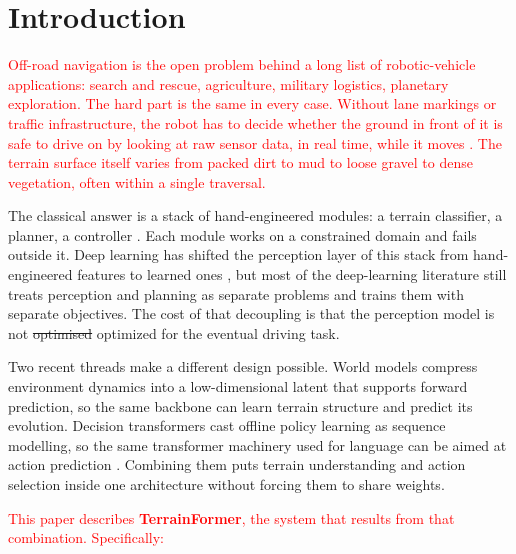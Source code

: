 \documentclass[sensors,article,submit,pdftex,moreauthors]{Definitions/mdpi}
\makeatletter
\providecommand{\DIFadd}[1]{{\protect\color{red}#1}} %
\providecommand{\DIFdel}[1]{{\protect\color{red}\sout{#1}}} %
\providecommand{\DIFaddbegin}{} %
\providecommand{\DIFaddend}{} %
\providecommand{\DIFdelbegin}{} %
\providecommand{\DIFdelend}{} %
\providecommand{\DIFscaledelfig}{0.5}
\newlength{\DIFdelgraphicswidth} %
\newlength{\DIFdelgraphicsheight} %
\providecommand{\DIFaddincludegraphics}[2][]{{\color{blue}\fbox{\DIFOincludegraphics[#1]{#2}}}} %
\providecommand{\DIFdelincludegraphics}[2][]{%
\sbox{\DIFdelgraphicsbox}{\DIFOincludegraphics[#1]{#2}}%
\settoboxwidth{\DIFdelgraphicswidth}{\DIFdelgraphicsbox} %
\settoboxtotalheight{\DIFdelgraphicsheight}{\DIFdelgraphicsbox} %
\scalebox{\DIFscaledelfig}{%
\parbox[b]{\DIFdelgraphicswidth}{\usebox{\DIFdelgraphicsbox}\\[-\baselineskip] \rule{\DIFdelgraphicswidth}{0em}}\llap{\resizebox{\DIFdelgraphicswidth}{\DIFdelgraphicsheight}{%
\setlength{\unitlength}{\DIFdelgraphicswidth}%
\begin{picture}(1,1)%
\thicklines\linethickness{2pt} %
{\color[rgb]{1,0,0}\put(0,0){\framebox(1,1){}}}%
{\color[rgb]{1,0,0}\put(0,0){\line( 1,1){1}}}%
{\color[rgb]{1,0,0}\put(0,1){\line(1,-1){1}}}%
\end{picture}%
}\hspace*{3pt}}} %
} %
\DeclareRobustCommand{\DIFaddbegin}{\DIFOaddbegin \let\includegraphics\DIFaddincludegraphics} %
\DeclareRobustCommand{\DIFaddend}{\DIFOaddend \let\includegraphics\DIFOincludegraphics} %
\DeclareRobustCommand{\DIFdelbegin}{\DIFOdelbegin \let\includegraphics\DIFdelincludegraphics} %
\DeclareRobustCommand{\DIFdelend}{\DIFOaddend \let\includegraphics\DIFOincludegraphics} %
\let\sout@orig\sout %
\renewcommand{\sout}[1]{\ifmmode\text{\sout@orig{\ensuremath{#1}}}\else\sout@orig{#1}\fi} %
\makeatother
\begin{document}
\section{Introduction}
\label{sec:introduction}
\textcolor{red}{Off-road navigation is the open problem behind a long list of robotic-vehicle applications: search and rescue, agriculture, military logistics, planetary exploration. The hard part is the same in every case. Without lane markings or traffic infrastructure, the robot has to decide whether the ground in front of it is safe to drive on by looking at raw sensor data, in real time, while it moves \cite{wellhausen2019, xiao2021}. The terrain surface itself varies from packed dirt to mud to loose gravel to dense vegetation, often within a single traversal.}

The classical answer is a stack of hand-engineered modules: a terrain classifier, a planner, a controller \cite{papadakis2013}. Each module works on a constrained domain and fails outside it. Deep learning has shifted the perception layer of this stack from hand-engineered features to learned ones \cite{maturana2018, wigness2019}, but most of the deep-learning literature still treats perception and planning as separate problems and trains them with separate objectives. The cost of that decoupling is that the perception model is not \DIFdelbegin \DIFdel{optimised }\DIFdelend \DIFaddbegin \DIFadd{optimized }\DIFaddend for the eventual driving task.

Two recent threads make a different design possible. World models \cite{ha2018, hafner2020, hafner2023} compress environment dynamics into a low-dimensional latent that supports forward prediction, so the same backbone can learn terrain structure and predict its evolution. Decision transformers \cite{chen2021, zheng2022} cast offline policy learning as sequence modelling, so the same transformer machinery used for language can be aimed at action prediction \cite{vaswani2017}. Combining them puts terrain understanding and action selection inside one architecture without forcing them to share weights.

\textcolor{red}{This paper describes \textbf{TerrainFormer}, the system that results from that combination. Specifically:}
\end{document}
